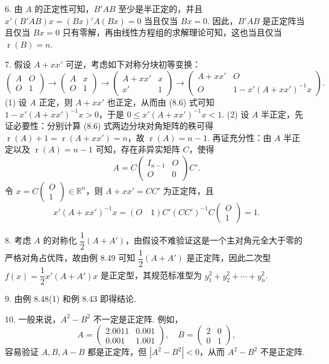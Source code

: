 \documentclass[UTF8,12pt,a4paper,fontset=fandol]{ctexart}
\begin{document}
6. 由 $A$ 的正定性可知，$B'AB$ 至少是半正定的，并且 $x'(B'AB)x=(Bx)'A(Bx)=0$ 当且仅当 $Bx=0$. 因此，$B'AB$ 是正定阵当且仅当 $Bx=0$ 只有零解，再由线性方程组的求解理论可知，这也当且仅当 $\operatorname{r}(B)=n$.

7. 假设 $A+xx'$ 可逆，考虑如下对称分块初等变换：
\begin{equation}
\left(\begin{array}{cc}
A & O\\
O & 1
\end{array}\right)
\to
\left(\begin{array}{cc}
A & x\\
O & 1
\end{array}\right)
\to
\left(\begin{array}{cc}
A+xx' & x\\
x' & 1
\end{array}\right)
\to
\left(\begin{array}{cc}
A+xx' & O\\
O & 1-x'(A+xx')^{-1}x
\end{array}\right).
\tag{8.6}
\end{equation}
(1) 设 $A$ 正定，则 $A+xx'$ 也正定，从而由 (8.6) 式可知 $1-x'(A+xx')^{-1}x>0$，于是 $0\le x'(A+xx')^{-1}x<1$. (2) 设 $A$ 半正定，先证必要性：分别计算 (8.6) 式两边分块对角矩阵的秩可得 $\operatorname{r}(A)+1=\operatorname{r}(A+xx')=n$，故 $\operatorname{r}(A)=n-1$. 再证充分性：由 $A$ 半正定以及 $\operatorname{r}(A)=n-1$ 可知，存在非异实矩阵 $C$，使得
\[
A=C\left(\begin{array}{cc}I_{n-1}&O\\ O&0\end{array}\right)C'.
\]
令 $x=C\left(\begin{array}{c}O\\ 1\end{array}\right)\in\mathbb{R}^n$，则 $A+xx'=CC'$ 为正定阵，且
\[
x'(A+xx')^{-1}x=(O\quad 1)C'(CC')^{-1}C\left(\begin{array}{c}O\\ 1\end{array}\right)=1.
\]

8. 考虑 $A$ 的对称化 $\dfrac12(A+A')$，由假设不难验证这是一个主对角元全大于零的严格对角占优阵，故由例 8.49 可知 $\dfrac12(A+A')$ 是正定阵，因此二次型 $f(x)=\dfrac12x'(A+A')x$ 是正定型，其规范标准型为 $y_1^2+y_2^2+\cdots+y_n^2$.

9. 由例 8.48(1) 和例 8.43 即得结论.

10. 一般来说，$A^2-B^2$ 不一定是正定阵. 例如，
\[
A=\left(\begin{array}{cc}2.0011&0.001\\ 0.001&1.001\end{array}\right),\quad
B=\left(\begin{array}{cc}2&0\\ 0&1\end{array}\right),
\]
容易验证 $A,B,A-B$ 都是正定阵，但 $|A^2-B^2|<0$，从而 $A^2-B^2$ 不是正定阵.
\end{document}
